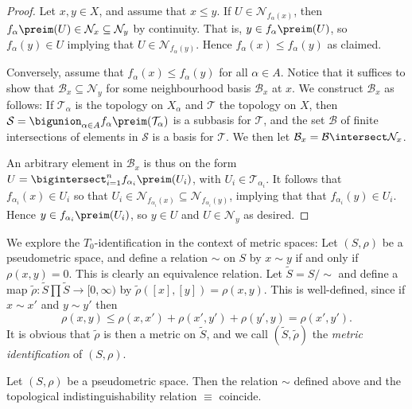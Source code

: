 \documentclass[article, a4paper, 11pt, oneside]{memoir}
\numberwithin{equation}{chapter}
\newcommand{\calT}{\mathcal{T}}
\newcommand{\calN}{\mathcal{N}}
\newcommand{\calB}{\mathcal{B}}
\newcommand{\calS}{\mathcal{S}}
\newcommand{\nhoodfilter}[1]{\calN_{#1}}
\begin{document}
\begin{proof}
    Let $x,y \in X$, and assume that $x \leq y$. If $U \in \nhoodfilter{f_\alpha(x)}$, then $f_\alpha\preim(U) \in \nhoodfilter{x} \subseteq \nhoodfilter{y}$ by continuity. That is, $y \in f_\alpha\preim(U)$, so $f_\alpha(y) \in U$ implying that $U \in \nhoodfilter{f_\alpha(y)}$. Hence $f_\alpha(x) \leq f_\alpha(y)$ as claimed.

    Conversely, assume that $f_\alpha(x) \leq f_\alpha(y)$ for all $\alpha \in A$. Notice that it suffices to show that $\calB_x \subseteq \nhoodfilter{y}$ for some neighbourhood basis $\calB_x$ at $x$. We construct $\calB_x$ as follows: If $\calT_\alpha$ is the topology on $X_\alpha$ and $\calT$ the topology on $X$, then $\calS = \bigunion_{\alpha \in A} f_\alpha\preim(\calT_\alpha)$ is a subbasis for $\calT$, and the set $\calB$ of finite intersections of elements in $\calS$ is a basis for $\calT$. We then let $\calB_x = \calB \intersect \nhoodfilter{x}$.

    An arbitrary element in $\calB_x$ is thus on the form $U = \bigintersect_{i=1}^n f_{\alpha_i}\preim(U_i)$, with $U_i \in \calT_{\alpha_i}$. It follows that $f_{\alpha_i}(x) \in U_i$ so that $U_i \in \nhoodfilter{f_{\alpha_i}(x)} \subseteq \nhoodfilter{f_{\alpha_i}(y)}$, implying that that $f_{\alpha_i}(y) \in U_i$. Hence $y \in f_{\alpha_i}\preim(U_i)$, so $y \in U$ and $U \in \nhoodfilter{y}$ as desired.
\end{proof}


We explore the $T_0$-identification in the context of metric spaces: Let $(S,\rho)$ be a pseudometric space, and define a relation $\sim$ on $S$ by $x \sim y$ if and only if $\rho(x,y) = 0$. This is clearly an equivalence relation. Let $\tilde{S} = S/{\sim}$ and define a map $\tilde{\rho} \colon \tilde{S} \prod \tilde{S} \to [0,\infty)$ by $\tilde{\rho}([x],[y]) = \rho(x,y)$. This is well-defined, since if $x \sim x'$ and $y \sim y'$ then
%
\begin{equation*}
    \rho(x,y)
        \leq \rho(x,x') + \rho(x',y') + \rho(y',y)
        = \rho(x',y').
\end{equation*}
%
It is obvious that $\tilde{\rho}$ is then a metric on $\tilde{S}$, and we call $(\tilde{S}, \tilde{\rho})$ the \emph{metric identification} of $(S,\rho)$.

\begin{proposition}
    Let $(S,\rho)$ be a pseudometric space. Then the relation $\sim$ defined above and the topological indistinguishability relation $\equiv$ coincide.
\end{proposition}
\end{document}
